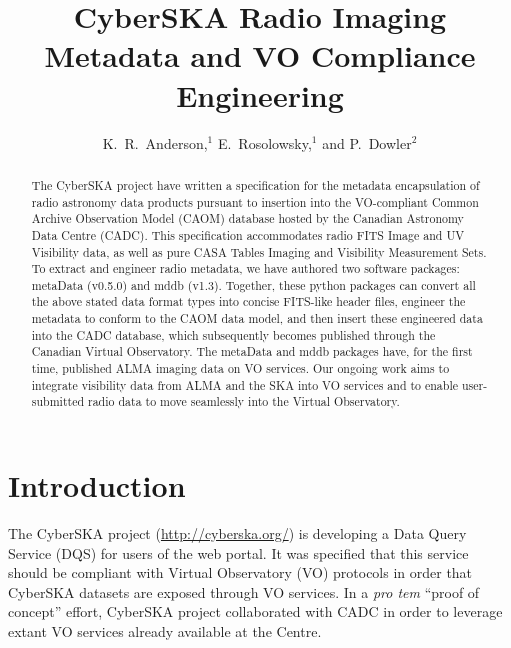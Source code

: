 
\resetcounters





\title{CyberSKA Radio Imaging Metadata and VO Compliance Engineering}
\author{K.~R.~Anderson,$^1$ E.~Rosolowsky,$^1$ and P.~Dowler$^2$
}


\begin{abstract}
The CyberSKA project have written a specification for the metadata
encapsulation of radio astronomy data products pursuant to insertion
into the VO-compliant Common Archive Observation Model (CAOM) database
hosted by the Canadian Astronomy Data Centre (CADC). This
specification accommodates radio FITS Image and UV Visibility data, as
well as pure CASA Tables Imaging and Visibility Measurement Sets. To
extract and engineer radio metadata, we have authored two software
packages: metaData (v0.5.0) and mddb (v1.3). Together, these python
packages can convert all the above stated data format types into
concise FITS-like header files, engineer the metadata to conform to
the CAOM data model, and then insert these engineered data into the
CADC database, which subsequently becomes published through the
Canadian Virtual Observatory. The metaData and mddb packages have, for
the first time, published ALMA imaging data on VO services. Our
ongoing work aims to integrate visibility data from ALMA and the SKA
into VO services and to enable user-submitted radio data to move
seamlessly into the Virtual Observatory. 
\end{abstract}

\section{Introduction}
The CyberSKA project  (\url{http://cyberska.org/}) is
developing a Data Query Service (DQS) for users of the web portal. It
was specified that this service should be compliant with Virtual
Observatory (VO) protocols in order that CyberSKA datasets are exposed
through VO services. In a \textit{pro tem} ``proof of concept'' effort,
CyberSKA project collaborated with CADC in order to leverage extant VO
services already available at the Centre.

